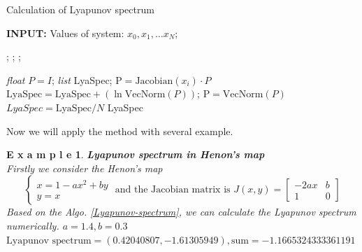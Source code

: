 \documentclass[12pt]{article}
\theoremstyle{plain}
\newtheorem{example}{\textbf{E x a m p l e}}[section]
\begin{document}
\begin{algorithm}[H]
\caption{Calculation of Lyapunov spectrum}\label{Lyapunov-spectrum}
\begin{algorithmic}
\State \textbf{INPUT:} Values of system: $x_0, x_1, \ldots x_N$;

\State {};\EndProcedure
\State {};\EndProcedure
\State {};\EndProcedure

\State {}
\State \textit{float} $P = I$; 
\State \textit{list} LyaSpec;
    \State $\text{P} = \text{Jacobian}(x_i) \cdot P$
    \State $\text{LyaSpec} = \text{LyaSpec} + (\ln\text{VecNorm}(P))$;
    \State $\text{P} = \text{VecNorm}(P)$
\EndFor
\State $LyaSpec = \text{LyaSpec} / N$
\State \Return LyaSpec
\EndProcedure
\end{algorithmic}
\end{algorithm}













Now we will apply the method with several example.


\begin{example}\textbf{Lyapunov spectrum in Henon's map}
\\\noindent Firstly we consider the Henon's map
$$
\left\{\begin{array}{l}
x = 1 - ax^2 + by \\
y = x
\end{array}\right. \text{ and the Jacobian matrix is } J(x, y) = \left[\begin{array}{lll}
-2ax    & b \\
1       & 0
\end{array}\right]
$$
Based on the Algo. \ref{Lyapunov-spectrum}, we can calculate the Lyapunov spectrum numerically.
  \noindent $a = 1.4, b = 0.3$
\\\noindent $\text{Lyapunov spectrum} = (0.42040807, -1.61305949), \text{sum} = -1.1665324333361191$
\end{example}
\end{document}
